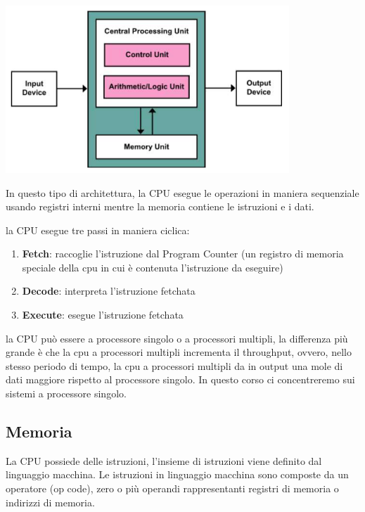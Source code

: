 \documentclass{article}
\begin{document}
        \begin{center}
        \includegraphics[width=0.8\textwidth]{immagini/architettura von neuman.png}
        \end{center}
        In questo tipo di architettura, la CPU esegue le operazioni in maniera sequenziale usando registri interni mentre la memoria contiene le istruzioni e i dati.

        la CPU esegue tre passi in maniera ciclica:
        
        \begin{enumerate}
            \item \textbf{Fetch}:
            raccoglie l'istruzione dal Program Counter (un registro di memoria speciale della cpu in cui è contenuta l'istruzione da eseguire)

            \item \textbf{Decode}:
            interpreta l'istruzione fetchata

            \item \textbf{Execute}:
            esegue l'istruzione fetchata
        \end{enumerate}
        la CPU può essere a processore singolo o a processori multipli, la differenza più grande è che la cpu a processori multipli incrementa il throughput, ovvero, nello stesso periodo di tempo, la cpu a processori multipli da in output una mole di dati maggiore rispetto al processore singolo. In questo corso ci concentreremo sui sistemi a processore singolo.

    \subsection{Memoria}
        La CPU possiede delle istruzioni, l'insieme di istruzioni viene definito dal linguaggio macchina. Le istruzioni in linguaggio macchina sono composte da un operatore (op code), zero o più operandi rappresentanti registri di memoria o indirizzi di memoria.
        
\end{document}
